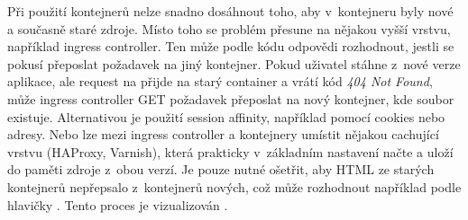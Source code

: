         Při použití kontejnerů nelze snadno dosáhnout toho, aby v~kontejneru byly nové a současně staré zdroje. Místo toho se problém přesune na nějakou vyšší vrstvu, například ingress controller. Ten může podle \HTTP kódu odpovědi rozhodnout, jestli se pokusí přeposlat požadavek na jiný kontejner. Pokud uživatel stáhne \HTML z~nové verze aplikace, ale request na  přijde na starý container a vrátí kód \textit{404 Not Found}, může ingress controller GET požadavek přeposlat na nový kontejner, kde soubor existuje. Alternativou je použití session affinity, například pomocí cookies nebo  adresy. Nebo lze mezi ingress controller a kontejnery umístit nějakou cachující \HTTP vrstvu (HAProxy, Varnish), která prakticky v~základním nastavení načte a uloží do paměti zdroje z~obou verzí. Je pouze nutné ošetřit, aby HTML ze starých kontejnerů nepřepsalo \HTML z~kontejnerů nových, což může rozhodnout například podle hlavičky . Tento proces je vizualizován .


